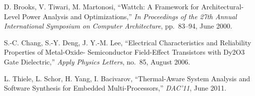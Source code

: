 \begin{thebibliography}{99}
    D. Brooks, V. Tiwari, M. Martonosi,
    ``Wattch: A Framework for Architectural-Level Power Analysis and Optimizations,''
    \emph{In Proceedings of the 27th Annual International Symposium on Computer Architecture},
    pp.~83--94, June 2000.

    S.-C. Chang, S.-Y. Deng, J. Y.-M. Lee,
    ``Electrical Characteristics and Reliability Properties of Metal-Oxide- Semiconductor Field-Effect Transistors with Dy2O3 Gate Dielectric,''
    \emph{Apply Physics Letters},
    no.~85, August 2006.

    L. Thiele, L. Schor, H. Yang, I. Bacivarov,
    ``Thermal-Aware System Analysis and Software Synthesis for Embedded Multi-Processors,''
    \emph{DAC'11},
    June 2011.
\end{thebibliography}
